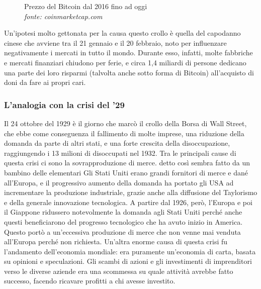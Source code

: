 \documentclass {article}
\begin{document}
\vspace {0.5cm}
\begin{figure}[htb!]
\centering
\caption {Prezzo del Bitcoin dal 2016 fino ad oggi\\\textit{fonte: coinmarketcap.com}}
\end{figure}
\vspace {0.2cm}
\noindent
%
Un'ipotesi molto gettonata per la causa questo crollo è quella del capodanno cinese che avviene tra il 21 gennaio e il 20 febbraio, noto per influenzare negativamente i mercati in tutto il mondo.
Durante esso, infatti, molte fabbriche e mercati finanziari chiudono per ferie, e circa 1,4 miliardi di persone dedicano una parte dei loro risparmi (talvolta anche sotto forma di Bitcoin) all'acquisto di doni da fare ai propri cari.


\subsubsection {L'analogia con la crisi del '29}


Il 24 ottobre del 1929 è il giorno che marcò il crollo della Borsa di Wall Street, che ebbe come conseguenza il fallimento di molte imprese, una riduzione della domanda da parte di altri stati, e una forte crescita della disoccupazione, raggiungendo i 13 milioni di disoccupati nel 1932.
Tra le principali cause di questa crisi ci sono la sovrapproduzione di merce. detto così sembra fatto da un bambino delle elementari
Gli Stati Uniti erano grandi fornitori di merce e dané all'Europa, e il progressivo aumento della domanda ha portato gli USA ad incrementare la produzione industriale, grazie anche alla diffusione del Taylorismo e della generale innovazione tecnologica.
A partire dal 1926, però, l'Europa e poi il Giappone ridussero notevolmente la domanda agli Stati Uniti perché anche questi beneficiarono del progresso tecnologico che ha avuto inizio in America.
Questo portò a un'eccessiva produzione di merce che non venne mai venduta all'Europa perché non richiesta.
Un'altra enorme causa di questa crisi fu l'andamento dell'economia mondiale: era puramente un'economia di carta, basata su opinioni e speculazioni.
Gli scambi di azioni e gli investimenti di imprenditori verso le diverse aziende era una scommessa su quale attività avrebbe fatto successo, facendo ricavare profitti a chi avesse investito. \cite{crisi29}
\end{document}
